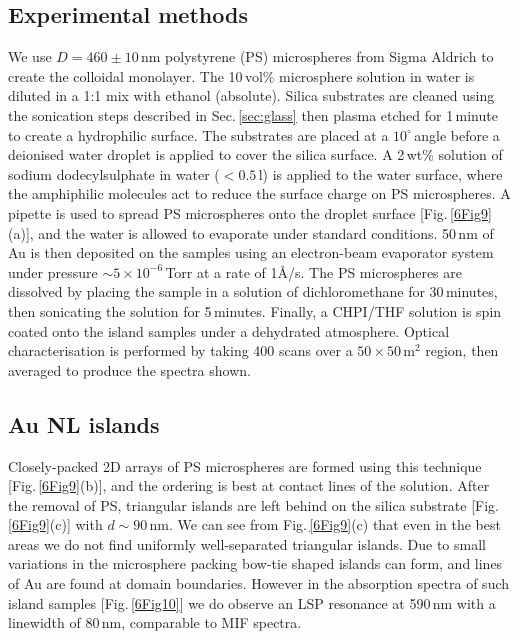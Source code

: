 \subsection{Experimental methods}
We use $D=460\pm10$\,nm polystyrene (PS) microspheres from Sigma Aldrich to create the colloidal monolayer. The 10\,vol\% microsphere solution in water is diluted in a 1:1 mix with ethanol (absolute). Silica substrates are cleaned %
using the sonication steps %
described in Sec.\,\ref{sec:glass} then plasma etched for 1\,minute to create a hydrophilic surface. The substrates are placed at a $10^{\circ}$\,angle before a deionised water droplet is applied to cover the silica surface. A 2\,wt\% solution of sodium dodecylsulphate in water ($<0.5\,$\textmu l) is applied to the water surface, where the amphiphilic molecules act to reduce the surface charge on PS microspheres. A pipette is used to spread PS microspheres onto the droplet surface [Fig.\,\ref{6Fig9}(a)], and the water is allowed to evaporate under standard conditions. 50\,nm of Au is then deposited on the samples using an electron-beam evaporator system under pressure $\sim5\times10^{-6}$\,Torr at a rate of 1\AA/s. The PS microspheres are dissolved by placing the sample in a solution of dichloromethane for 30\,minutes, then sonicating the solution for 5\,minutes. Finally, a CHPI/THF solution is spin coated onto the island samples under a dehydrated atmosphere. Optical characterisation is performed by taking 400 scans over a $50\times50\,$\textmu m$^{2}$ region, then averaged to produce the spectra shown. 

\subsection{Au NL islands}
Closely-packed 2D arrays of PS microspheres are formed using this technique [Fig.\,\ref{6Fig9}(b)], and the ordering is best at contact lines of the solution. After the removal of PS, triangular islands are left behind on the silica substrate [Fig.\,\ref{6Fig9}(c)] with $d\sim90$\,nm. We can see from Fig.\,\ref{6Fig9}(c) that even in the best areas we do not find uniformly well-separated triangular islands. Due to small variations in the microsphere packing bow-tie shaped islands can form, and lines of Au are found at domain boundaries. However in the absorption spectra of such island samples [Fig.\,\ref{6Fig10}] we do observe an LSP resonance at 590\,nm with a linewidth of 80\,nm, comparable to MIF spectra.


